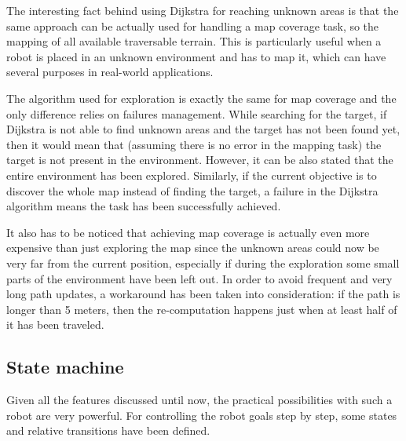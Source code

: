 \documentclass[9pt,conference]{IEEEtran}
\begin{document}
The interesting fact behind using Dijkstra for reaching unknown areas is that the same approach can be actually used for handling a map coverage task, so the mapping of all available traversable terrain. This is particularly useful when a robot is placed in an unknown environment and has to map it, which can have several purposes in real-world applications.

The algorithm used for exploration is exactly the same for map coverage and the only difference relies on failures management. While searching for the target, if Dijkstra is not able to find unknown areas and the target has not been found yet, then it would mean that (assuming there is no error in the mapping task) the target is not present in the environment. However, it can be also stated that the entire environment has been explored. Similarly, if the current objective is to discover the whole map instead of finding the target, a failure in the Dijkstra algorithm means the task has been successfully achieved.

It also has to be noticed that achieving map coverage is actually even more expensive than just exploring the map since the unknown areas could now be very far from the current position, especially if during the exploration some small parts of the environment have been left out. In order to avoid frequent and very long path updates, a workaround has been taken into consideration: if the path is longer than 5 meters, then the re-computation happens just when at least half of it has been traveled.


\subsection{State machine}

Given all the features discussed until now, the practical possibilities with such a robot are very powerful. For controlling the robot goals step by step, some states and relative transitions have been defined.
\end{document}
